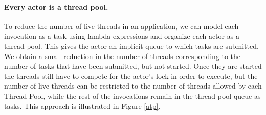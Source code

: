 \paragraph{Every actor is a thread pool.}
To reduce the number of live threads in an application, we can model each invocation as a task using lambda expressions and organize each actor as a thread pool. This gives the actor an implicit queue to which tasks are submitted. We obtain a small reduction in the number of threads corresponding to the number of tasks that have been submitted, but not started. Once they are started the threads still have to compete for the actor's lock in order to execute, but the number of live threads can be restricted to the number of threads allowed by each Thread Pool, while the rest of the invocations remain in the thread pool queue as tasks. This approach is illustrated in Figure \ref{atp}. 



